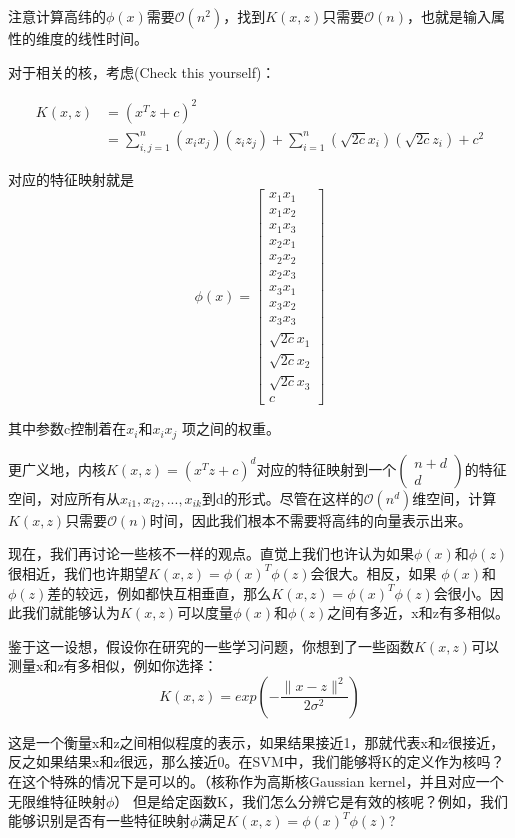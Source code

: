 \documentclass[UTF8]{ctexart}
\begin{document}
注意计算高纬的$\phi(x)$需要$\mathcal{O}(n^{2})$，找到$ K(x,z) $只需要$\mathcal{O}(n)$，也就是输入属性的维度的线性时间。

对于相关的核，考虑(Check this yourself)：

\begin{align*}
K(x,z) & = (x^{T}z+c)^{2} \\
& = \sum_{i,j=1}^{n} (x_{i}x_{j})(z_{i}z_{j}) + \sum_{i=1}^{n} (\sqrt{2c}x_{i})(\sqrt{2c}z_{i}) + c^{2}
\end{align*}

对应的特征映射就是\[\phi(x) = \begin{bmatrix} x_{1}x_{1}\\  x_{1}x_{2}\\ x_{1}x_{3}\\ x_{2}x_{1}\\  x_{2}x_{2}\\ x_{2}x_{3}\\x_{3}x_{1}\\  x_{3}x_{2}\\ x_{3}x_{3}  \\  \sqrt{2c}x_{1} \\ \sqrt{2c}x_{2}  \\ \sqrt{2c}x_{3} \\ c \end{bmatrix}  \]

其中参数c控制着在$x_{i}$和$x_{i}x_{j}$ 项之间的权重。


更广义地，内核$K(x,z) = (x^{T}z+c)^{d}$对应的特征映射到一个$\left( \begin{matrix} n+d \\d\end{matrix}\right)$的特征空间，对应所有从$x_{i1},x_{i2},...,x_{ik}$到d的形式。尽管在这样的$\mathcal{O}(n^{d})$维空间，计算$ K(x,z) $只需要$\mathcal{O}(n)$时间，因此我们根本不需要将高纬的向量表示出来。

现在，我们再讨论一些核不一样的观点。直觉上我们也许认为如果$\phi(x)$和$\phi(z)$很相近，我们也许期望$K(x,z) =\phi(x)^{T} \phi(z) $会很大。相反，如果 $\phi(x)$和$\phi(z) $差的较远，例如都快互相垂直，那么$K(x,z) =\phi(x)^{T} \phi(z) $会很小。因此我们就能够认为$ K(x,z) $可以度量$\phi(x)$和$\phi(z)$之间有多近，x和z有多相似。

鉴于这一设想，假设你在研究的一些学习问题，你想到了一些函数$ K(x,z)$可以测量x和z有多相似，例如你选择：\[ K(x,z) = exp\left( - \frac{\|x-z\|^{2}}{2\sigma^{2}}  \right)  \]

这是一个衡量x和z之间相似程度的表示，如果结果接近1，那就代表x和z很接近，反之如果结果x和z很远，那么接近0。在SVM中，我们能够将K的定义作为核吗？在这个特殊的情况下是可以的。（核称作为高斯核Gaussian kernel，并且对应一个无限维特征映射$\phi$） 但是给定函数K，我们怎么分辨它是有效的核呢？例如，我们能够识别是否有一些特征映射$\phi$满足$K(x,z)=\phi(x)^{T}\phi(z)$?
\end{document}
